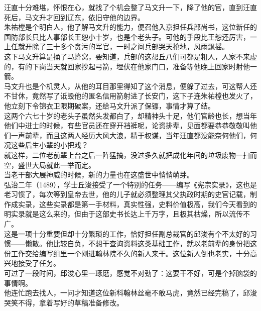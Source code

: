\begin{multicols}{\theparacolNo}
汪直十分难堪，怀恨在心，就找了个机会整了马文升一下，降了他的官，直到汪直死后，马文升才回到辽东，依旧守他的边界。\\

朱祐樘是个明白人，他了解马文升的能力，便召他入京担任兵部尚书，这位新任的国防部长只比人事部长王恕小十岁，也是个老头子。可他的手段比王恕还厉害，一上任就开除了三十多个贪污的军官，一时之间兵部哭天抢地，风雨飘摇。\\

这下马文升算是捅了马蜂窝，要知道，兵部的这帮丘八们可都是粗人，人家不来虚的，有的下岗当天就回家抄起弓箭，埋伏在他家门口，准备等他晚上回家时射他一箭。\\

马文升也是个机灵人，从他的耳目那里得知了这个消息，便躲了过去，可这帮人还不甘休，竟然写了诋毁他的匿名信用箭射进了长安门，这下子连朱祐樘也发火了，他立刻下令锦衣卫限期破案，还给马文升派了保镖，事情才算了结。\\

这两个六七十岁的老头子虽然头发都白了，却精神头十足，他们官龄也长，想当年他们中进士的时候，有些官员还在穿开裆裤呢，论资排辈，见面都要恭恭敬敬叫他们一声前辈，而且这两人经历大风大浪，精于权谋，当年汪直都没能奈何他们，何况这些后生小辈的小把戏？\\

就这样，二位老前辈上台之后一阵猛搞，没过多久就把成化年间的垃圾废物一扫而空，盛世大局就此一举而定。\\

当老干部大展神威的时候，新的力量也在这盛世中悄悄萌芽。\\

弘治二年（1489），学士丘浚接受了一个特别的任务——编写《宪宗实录》，这也是老习惯了，每次等到皇帝去世，他的儿子就必须整理其父执政时期的史官记载，制作成实录，这些实录都是第一手材料，真实性强，史料价值极高，我们今天看到的明实录就是这么来的，但由于这部史书长达上千万字，且极其枯燥，所以流传不广。\\

这是一项十分重要但却十分繁琐的工作，恰好担任副总裁官的邱浚有个不太好的习惯——懒散。他比较自负，不想干查询资料这类基础工作，就以老前辈的身份把这份工作交给编写组里一个刚进翰林院不久的新人来干。这位新人倒也老实，十分高兴地接受了任务。\\

可过了一段时间，邱浚心里一琢磨，感觉不对劲了：这要干不好，可是个掉脑袋的事情啊。\\

他连忙跑去找人，一问才知道这位新科翰林丝毫不敢马虎，竟然已经完稿了，邱浚哭笑不得，拿着写好的草稿准备修改。\\


\end{multicols}
